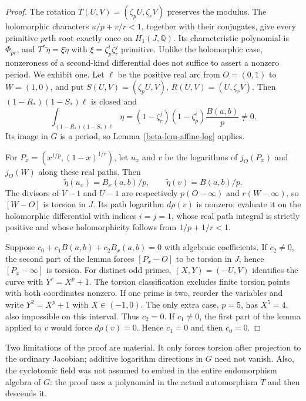 \documentclass[11pt,a4paper]{article}
\theoremstyle{definition}
\theoremstyle{remark}
\numberwithin{equation}{section}
\begin{document}
\begin{proof}
The rotation $T(U,V)=(\zeta_pU,\zeta_rV)$ preserves the modulus.  The
holomorphic characters $u/p+v/r<1$, together with their conjugates,
give every primitive $pr$th root exactly once on $H_1(J,\mathbb Q)$.
Its characteristic polynomial is $\Phi_{pr}$, and
$T^*\widetilde\eta=\xi\widetilde\eta$ with
$\xi=\zeta_p^i\zeta_r^j$ primitive.
Unlike the holomorphic case, nonzeroness of a second-kind differential
does not suffice to assert a nonzero period.  We exhibit one.  Let
$\ell$ be the positive real arc from $O=(0,1)$ to $W=(1,0)$, and put
$S(U,V)=(\zeta_pU,V)$, $R(U,V)=(U,\zeta_rV)$.  Then
$(1-R_*)(1-S_*)\ell$ is closed and
\begin{equation}\label{beta-eq-beta-period}
\int_{(1-R_*)(1-S_*)\ell}\eta
=(1-\zeta_r^j)(1-\zeta_p^i)\frac{B(a,b)}p\ne0.
\end{equation}
Its image in $G$ is a period, so
Lemma~\ref{beta-lem-affine-log} applies.

For $P_x=(x^{1/p},(1-x)^{1/r})$, let $u_x$ and $v$ be the logarithms
of $j_O(P_x)$ and $j_O(W)$ along these real paths.  Then
\[
\widetilde\eta(u_x)=B_x(a,b)/p,\qquad
\widetilde\eta(v)=B(a,b)/p.
\]
The divisors of $V-1$ and $U-1$ are respectively
$p(O-\infty)$ and $r(W-\infty)$, so $[W-O]$ is torsion in $J$.
Its path logarithm $d\rho(v)$ is nonzero: evaluate it on the
holomorphic differential with indices $i=j=1$, whose real path integral
is strictly positive and whose holomorphicity follows from
$1/p+1/r<1$.

Suppose $c_0+c_1B(a,b)+c_2B_x(a,b)=0$ with algebraic coefficients.
If $c_2\ne0$, the second part of the lemma forces $[P_x-O]$ to be
torsion in $J$, hence $[P_x-\infty]$ is torsion.  For distinct odd
primes, $(X,Y)=(-U,V)$ identifies the curve with $Y^r=X^p+1$.
The torsion classification \cite[Theorem~6.2.21]{beta-arul} excludes
finite torsion points with both coordinates nonzero.  If one prime is
two, reorder the variables and write $Y^2=X^p+1$ with
$X\in(-1,0)$.  The only extra case, $p=5$, has $X^5=4$,
also impossible on this interval.  Thus $c_2=0$.
If $c_1\ne0$, the first part of the lemma applied to $v$ would force
$d\rho(v)=0$.  Hence $c_1=0$ and then $c_0=0$.
\end{proof}

Two limitations of the proof are material.  It only forces torsion
after projection to the ordinary Jacobian; additive logarithm
directions in $G$ need not vanish.  Also, the cyclotomic field was not
assumed to embed in the entire endomorphism algebra of $G$: the proof
uses a polynomial in the actual automorphism $T$ and then descends it.
\end{document}

